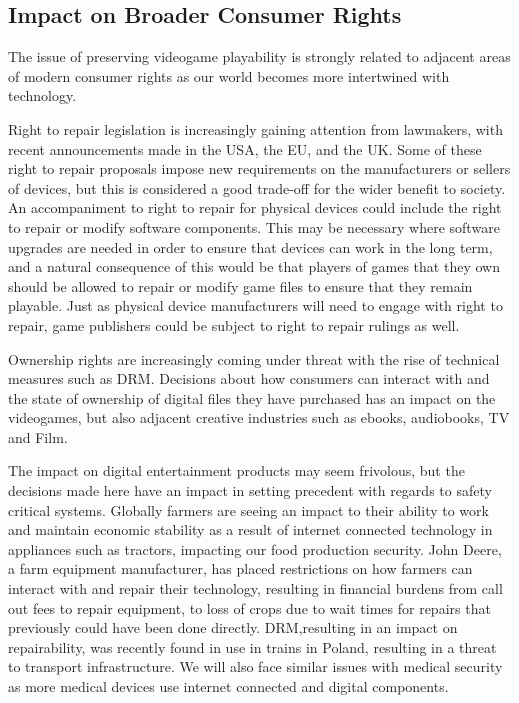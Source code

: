 \subsection{Impact on Broader Consumer Rights}
The issue of preserving videogame playability is strongly related to adjacent areas of modern consumer rights as our world becomes more intertwined with technology.

Right to repair legislation is increasingly gaining attention from lawmakers, with recent announcements made in the USA\cite{us-repair-2024}, the EU\cite{eu-repair-2024}, and the UK\cite{uk-repair-2021}.
Some of these right to repair proposals impose new requirements on the manufacturers or sellers of devices, but this is considered a good trade-off for the wider benefit to society.
An accompaniment to right to repair for physical devices could include the right to repair or modify software components.
This may be necessary where software upgrades are needed in order to ensure that devices can work in the long term,
and a natural consequence of this would be that players of games that they own should be allowed to repair or modify game files to ensure that they remain playable.
Just as physical device manufacturers will need to engage with right to repair, game publishers could be subject to right to repair rulings as well.

Ownership rights are increasingly coming under threat with the rise of technical measures such as DRM.
Decisions about how consumers can interact with and the state of ownership of  digital files they have purchased has an impact on the videogames,
but also adjacent creative industries such as ebooks, audiobooks, TV and Film.

The impact on digital entertainment products may seem frivolous,
but the decisions made here have an impact in setting precedent with regards to safety critical systems.
Globally farmers are seeing an impact to their ability to work and maintain economic stability as a result of internet connected technology in appliances such as tractors, impacting our food production security.
John Deere, a farm equipment manufacturer, has placed restrictions on how farmers can interact with and repair their technology,
resulting in financial burdens from call out fees to repair equipment\cn, to loss of crops due to wait times for repairs that previously could have been done directly\cn.
DRM,resulting in an impact on repairability, was recently found in use in trains in Poland, resulting in  a threat to transport infrastructure.
We will also face similar issues with medical security as more medical devices use internet connected and digital components\cn.

